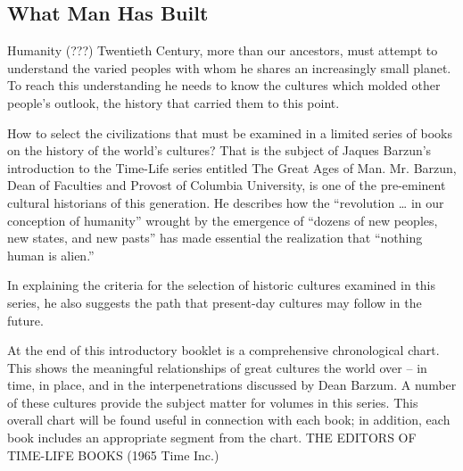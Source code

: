 \subsection{What Man Has Built}

Humanity (???) Twentieth Century, more than our ancestors, must attempt to understand the varied peoples with whom he shares an increasingly small planet. To reach this understanding he needs to know the cultures which molded other people’s outlook, the history that carried them to this point.

How to select the civilizations that must be examined in a limited series of books on the history of the world’s cultures?  That is the subject of Jaques Barzun’s introduction to the Time-Life series entitled The Great Ages of Man. Mr. Barzun, Dean of Faculties and Provost of Columbia University, is one of the pre-eminent cultural historians of this generation. He describes how the “revolution … in our conception of humanity” wrought by the emergence of “dozens of new peoples, new states, and new pasts” has made essential the realization that “nothing human is alien.”

In explaining the criteria for the selection of historic cultures examined in this series, he also suggests the path that present-day cultures may follow in the future.

At the end of this introductory booklet is a comprehensive chronological chart. This shows the meaningful relationships of great cultures the world over – in time, in place, and in the interpenetrations discussed by Dean Barzum. A number of these cultures provide the subject matter for volumes in this series. This overall chart will be found useful in connection with each book; in addition, each book includes an appropriate segment from the chart. THE EDITORS OF TIME-LIFE BOOKS (1965 Time Inc.)
